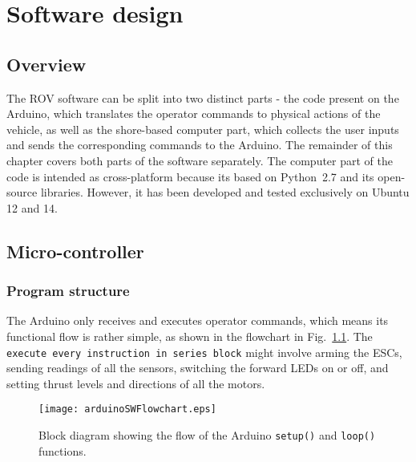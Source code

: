 \pagestyle{chapter-fancy-style}
\chapter{Software design}

\section{Overview}
The ROV software can be split into two distinct parts - the code present on the Arduino, which translates the operator commands to physical actions of the vehicle, as well as the shore-based computer part, which collects the user inputs and sends the corresponding commands to the Arduino. The remainder of this chapter covers both parts of the software separately. The computer part of the code is intended as cross-platform because its based on Python~2.7 and its open-source libraries. However, it has been developed and tested exclusively on Ubuntu 12 and 14.

\section{Micro-controller}

\subsection{Program structure}
The Arduino only receives and executes operator commands, which means its functional flow is rather simple, as shown in the flowchart in Fig.~\ref{fig:arduinoMainLoop}. The \texttt{execute every instruction in series block} might involve arming the ESCs, sending readings of all the sensors, switching the forward LEDs on or off, and setting thrust levels and directions of all the motors.

\begin{figure}[]
\centering
\texttt{[image: arduinoSWFlowchart.eps]}
\caption{Block diagram showing the flow of the Arduino \texttt{setup()} and \texttt{loop()} functions.}
\label{fig:arduinoMainLoop}
\end{figure}

